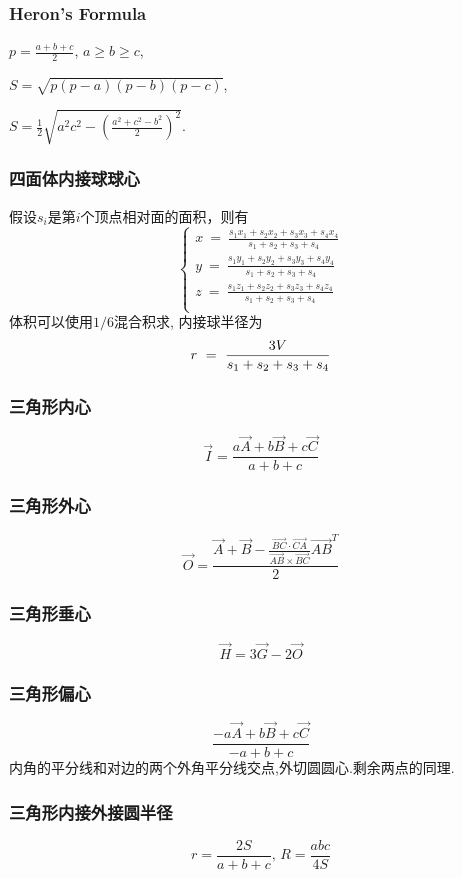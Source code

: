\begin{small}
\begin{spacing}{0.5}
\begin{multicols*}{2}
	\subsubsection{Heron's Formula}
	$p=\frac{a+b+c}{2}$, $a \geq b \geq c$, 

	$S=\sqrt{p(p-a)(p-b)(p-c)}$,

	$S=\frac{1}{2}\sqrt{a^2 c^2 - \left( \frac{a^2 + c^2 - b^2}{2} \right)^2}$.

\subsubsection{四面体内接球球心}
假设$s_i$是第$i$个顶点相对面的面积，则有
\[\left\{
\begin{aligned}
x \ = \ \frac{s_1x_1+s_2x_2+s_3x_3+s_4x_4}{s_1+s_2+s_3+s_4}\\
y \ = \ \frac{s_1y_1+s_2y_2+s_3y_3+s_4y_4}{s_1+s_2+s_3+s_4}\\
z \ = \ \frac{s_1z_1+s_2z_2+s_3z_3+s_4z_4}{s_1+s_2+s_3+s_4}\\
\end{aligned}\right.\]
体积可以使用$1/6$混合积求, 内接球半径为
\[
r \ = \ \frac{3V}{s_1+s_2+s_3+s_4} \\
\]
\subsubsection{三角形内心}
	\[ \vec{I} = \frac{a\vec {A} + b\vec{B} + c\vec{C}}{a + b + c} \]
\subsubsection{三角形外心}
	\[ \vec{O} = \frac{\vec{A} + \vec{B} - \frac{\overrightarrow {BC} \cdot \overrightarrow{CA}}{\overrightarrow {AB} \times \overrightarrow{BC}}\overrightarrow {AB}^T}{2} \]
\subsubsection{三角形垂心}
	\[ \vec{H} = 3\vec{G} - 2\vec{O} \]
\subsubsection{三角形偏心}
	\[ \frac{-a\vec {A} + b\vec{B} + c\vec{C}}{-a + b + c} \]
	内角的平分线和对边的两个外角平分线交点,外切圆圆心.剩余两点的同理. 
\subsubsection{三角形内接外接圆半径}
	\[ r=\frac{2S}{a+b+c},\, R=\frac{abc}{4S} \]

\end{multicols*}
\end{spacing}
\end{small}
